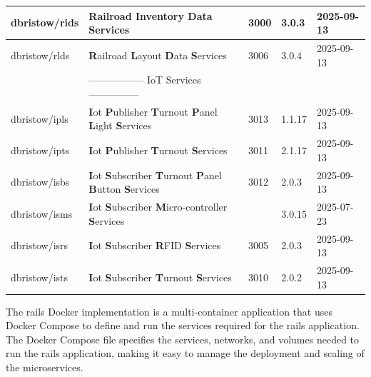 \begin{longtable}{|L{3cm}|L{7cm}|L{1cm}|L{1.5cm}|L{2cm}|}
  dbristow/rids & \textbf{R}ailroad \textbf{I}nventory \textbf{D}ata \textbf{S}ervices  & 3000 & 3.0.3 & 2025-09-13 \\ \hline
  dbristow/rlds & \textbf{R}ailroad \textbf{L}ayout \textbf{D}ata \textbf{S}ervices  & 3006 & 3.0.4 & 2025-09-13 \\ \hline
  & ----------------- IoT Services --------------- &  &  & \\ \hline
  dbristow/ipls & \textbf{I}ot \textbf{P}ublisher \textbf{T}urnout \textbf{P}anel \textbf{L}ight \textbf{S}ervices & 3013 & 1.1.17 & 2025-09-13 \\ \hline
  dbristow/ipts & \textbf{I}ot \textbf{P}ublisher \textbf{T}urnout \textbf{S}ervices & 3011 & 2.1.17 & 2025-09-13 \\ \hline
  dbristow/isbs & \textbf{I}ot \textbf{S}ubscriber \textbf{T}urnout \textbf{P}anel \textbf{B}utton \textbf{S}ervices & 3012 & 2.0.3 & 2025-09-13 \\ \hline
  dbristow/isms & \textbf{I}ot \textbf{S}ubscriber \textbf{M}icro-controller \textbf{S}ervices &  & 3.0.15 & 2025-07-23 \\ \hline
  dbristow/isrs & \textbf{I}ot \textbf{S}ubscriber \textbf{R}FID \textbf{S}ervices & 3005 & 2.0.3 & 2025-09-13 \\ \hline
  dbristow/ists & \textbf{I}ot \textbf{S}ubscriber \textbf{T}urnout \textbf{S}ervices & 3010 & 2.0.2 & 2025-09-13 \\ \hline
    \end{longtable}
The \gls{rails} Docker implementation is a multi-container application that uses Docker Compose to define and run the services required for the \gls{rails} application. The Docker Compose file specifies the services, networks, and volumes needed to run the \gls{rails} application, making it easy to manage the deployment and scaling of the microservices.
